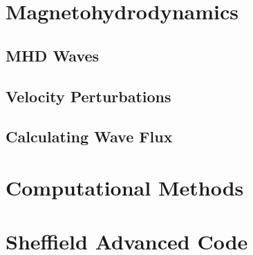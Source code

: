 \section{Magnetohydrodynamics}\label{sec:MHD}

\subsection{MHD Waves}\label{sec:MHDwaves}

\subsection{Velocity Perturbations}\label{sec:Vpert}

\subsection{Calculating Wave Flux}\label{sec:waveflux}

\section{Computational Methods}\label{sec:numericalmethods}

\section{Sheffield Advanced Code}\label{sec:SAC}